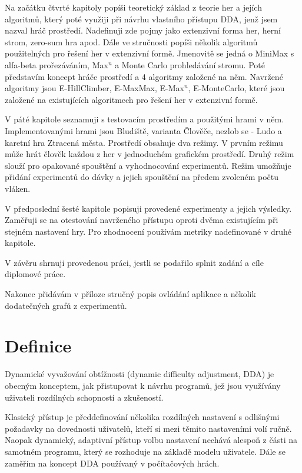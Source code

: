 Na začátku čtvrté kapitoly popíši teoretický základ z teorie her a jejích algoritmů, který poté využiji při návrhu vlastního přístupu DDA, jenž jsem nazval hráč prostředí. Nadefinuji zde pojmy jako extenzivní forma her, herní strom, zero-sum hra apod. Dále ve stručnosti popíši několik algoritmů použitelných pro řešení her v extenzivní formě. Jmenovitě se jedná o MiniMax s alfa-beta prořezáváním, Max$^n$ a Monte Carlo prohledávání stromu.
Poté představím koncept hráče prostředí a 4 algoritmy založené na něm. Navržené algoritmy jsou E-HillClimber, E-MaxMax, E-Max$^n$, E-MonteCarlo, které jsou založené na existujících algoritmech pro řešení her v extenzivní formě.

V páté kapitole seznamuji s testovacím prostředím a použitými hrami v něm. Implementovanými hrami jsou Bludiště, varianta Člověče, nezlob se - Ludo a karetní hra Ztracená města. Prostředí obsahuje dva režimy. V prvním režimu může hrát člověk každou z her v jednoduchém grafickém prostředí. Druhý režim slouží pro opakované spouštění a vyhodnocování experimentů. Režim umožňuje přidání experimentů do dávky a jejich spouštění na předem zvoleném počtu vláken.

V předposlední šesté kapitole popisuji provedené experimenty a jejich výsledky. Zaměřuji se na otestování navrženého přístupu oproti dvěma existujícím při stejném nastavení hry. Pro zhodnocení používám metriky nadefinované v druhé kapitole.

V závěru shrnuji provedenou práci, jestli se podařilo splnit zadání a cíle diplomové práce.

Nakonec přidávám v příloze stručný popis ovládání aplikace a několik dodatečných grafů z experimentů.

\section{Definice}

Dynamické vyvažování obtížnosti (dynamic difficulty adjustment, DDA) je obecným konceptem, jak přistupovat k návrhu programů, jež jsou využívány uživateli rozdílných schopností a zkušeností. 

Klasický přístup je předdefinování několika rozdílných nastavení s odlišnými požadavky na dovednosti uživatelů, kteří si mezi těmito nastaveními volí ručně. Naopak dynamický, adaptivní přístup volbu nastavení nechává alespoň z části na samotném programu, který se rozhoduje na základě modelu uživatele. Dále se zaměřím na koncept DDA používaný v počítačových hrách.

